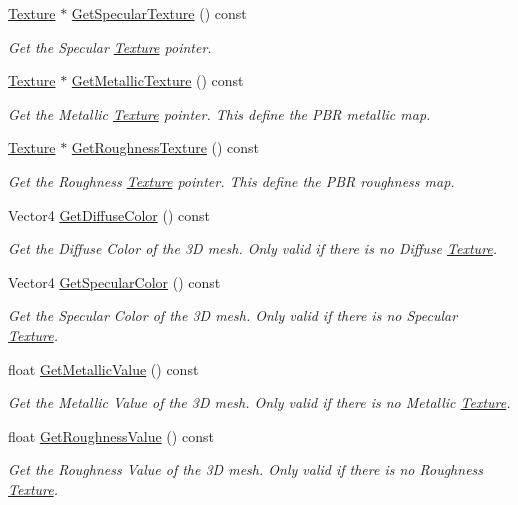 \begin{DoxyCompactItemize}
\hyperlink{classTexture}{Texture} $\ast$ \hyperlink{classMaterial_a0d3d4ef96719146ae94a36500f603a35}{Get\+Specular\+Texture} () const
\begin{DoxyCompactList}\small\item\em Get the Specular \hyperlink{classTexture}{Texture} pointer. \end{DoxyCompactList}\item 
\hyperlink{classTexture}{Texture} $\ast$ \hyperlink{classMaterial_a29ba7e0e96585a71dbc639ef1f576f04}{Get\+Metallic\+Texture} () const
\begin{DoxyCompactList}\small\item\em Get the Metallic \hyperlink{classTexture}{Texture} pointer. This define the P\+BR metallic map. \end{DoxyCompactList}\item 
\hyperlink{classTexture}{Texture} $\ast$ \hyperlink{classMaterial_a6b55a54f7f10121c760abb79f2f7a410}{Get\+Roughness\+Texture} () const
\begin{DoxyCompactList}\small\item\em Get the Roughness \hyperlink{classTexture}{Texture} pointer. This define the P\+BR roughness map. \end{DoxyCompactList}\item 
Vector4 \hyperlink{classMaterial_af34f2b2d5ef3ee26f81dd9fc7e90162f}{Get\+Diffuse\+Color} () const
\begin{DoxyCompactList}\small\item\em Get the Diffuse Color of the 3D mesh. Only valid if there is no Diffuse \hyperlink{classTexture}{Texture}. \end{DoxyCompactList}\item 
Vector4 \hyperlink{classMaterial_af730a062421aa6a8cb85f24e6b7074da}{Get\+Specular\+Color} () const
\begin{DoxyCompactList}\small\item\em Get the Specular Color of the 3D mesh. Only valid if there is no Specular \hyperlink{classTexture}{Texture}. \end{DoxyCompactList}\item 
float \hyperlink{classMaterial_a491f2523cf8b159352c0137057c94212}{Get\+Metallic\+Value} () const
\begin{DoxyCompactList}\small\item\em Get the Metallic Value of the 3D mesh. Only valid if there is no Metallic \hyperlink{classTexture}{Texture}. \end{DoxyCompactList}\item 
float \hyperlink{classMaterial_a83d88169ada8d6094df872c1a0d82765}{Get\+Roughness\+Value} () const
\begin{DoxyCompactList}\small\item\em Get the Roughness Value of the 3D mesh. Only valid if there is no Roughness \hyperlink{classTexture}{Texture}. \end{DoxyCompactList}\end{DoxyCompactItemize}
